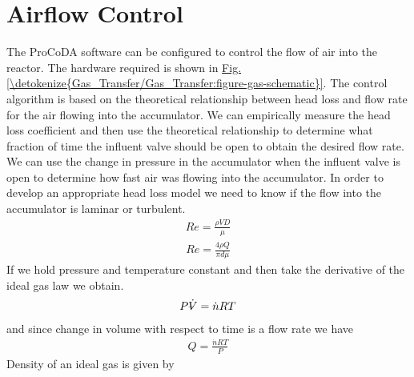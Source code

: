 \documentclass[letterpaper,10pt,english]{sphinxmanual}
\begin{document}
\section{Airflow Control}
\label{\detokenize{Gas_Transfer/Gas_Transfer:airflow-control}}\label{\detokenize{Gas_Transfer/Gas_Transfer:heading-gas-transfer-airflow-control}}
The ProCoDA software can be configured to control the flow of air into the reactor. The hardware required is shown in \hyperref[\detokenize{Gas_Transfer/Gas_Transfer:figure-gas-schematic}]{Fig.\@ \ref{\detokenize{Gas_Transfer/Gas_Transfer:figure-gas-schematic}}}. The control algorithm is based on the theoretical relationship between head loss and flow rate for the air flowing into the accumulator. We can empirically measure the head loss coefficient and then use the theoretical relationship to determine what fraction of time the influent valve should be open to obtain the desired flow rate. We can use the change in pressure in the accumulator when the influent valve is open to determine how fast air was flowing into the accumulator. In order to develop an appropriate head loss model we need to know if the flow into the accumulator is laminar or turbulent.
\begin{equation}\label{equation:Gas_Transfer/Gas_Transfer:eq_Gas_Re}
\begin{split}{Re}=\frac{\rho VD}{\mu }\end{split}
\end{equation}\begin{equation}\label{equation:Gas_Transfer/Gas_Transfer:Gas_Transfer/Gas_Transfer:8}
\begin{split}{Re}=\frac{4\rho Q}{\pi d\mu }\end{split}
\end{equation}
If we hold pressure and temperature constant and then take the derivative of the ideal gas law we obtain.
\begin{equation}\label{equation:Gas_Transfer/Gas_Transfer:Gas_Transfer/Gas_Transfer:9}
\begin{split}P\rlap{--}\dot{V}=\dot{n}RT\end{split}
\end{equation}
and since change in volume with respect to time is a flow rate we have
\begin{equation}\label{equation:Gas_Transfer/Gas_Transfer:eq_Gas_Qair}
\begin{split}Q=\frac{\dot{n}RT}{P}\end{split}
\end{equation}
Density of an ideal gas is given by
\end{document}
